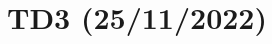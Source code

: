 \documentclass{article}
\begin{document}






\newpage


\section{TD3 (25/11/2022)}
\end{document}
